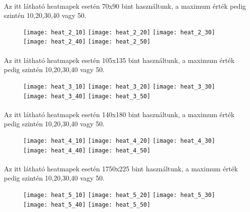 	\paragraph{}
	Az itt látható heatmapek esetén 70x90 bint használtunk, a maximum érték pedig szintén 10,20,30,40 vagy 50. 
	\begin{figure}[h]
		\begin{multicols}{2}
			\texttt{[image: heat\_2\_10]}
			\texttt{[image: heat\_2\_20]}
			\texttt{[image: heat\_2\_30]}
			\texttt{[image: heat\_2\_40]}
			\texttt{[image: heat\_2\_50]}		
		\end{multicols}
	\end{figure}	
	\clearpage	
	\paragraph{}
	Az itt látható heatmapek esetén 105x135 bint használtunk, a maximum érték pedig szintén 10,20,30,40 vagy 50. 
	\begin{figure}[h]
		\begin{multicols}{2}
			\texttt{[image: heat\_3\_10]}
			\texttt{[image: heat\_3\_20]}
			\texttt{[image: heat\_3\_30]}
			\texttt{[image: heat\_3\_40]}
			\texttt{[image: heat\_3\_50]}		
		\end{multicols}
	\end{figure}	
	\clearpage	
	\paragraph{}
	Az itt látható heatmapek esetén 140x180 bint használtunk, a maximum érték pedig szintén 10,20,30,40 vagy 50. 
	\begin{figure}[h]
		\begin{multicols}{2}
			\texttt{[image: heat\_4\_10]}
			\texttt{[image: heat\_4\_20]}
			\texttt{[image: heat\_4\_30]}
			\texttt{[image: heat\_4\_40]}
			\texttt{[image: heat\_4\_50]}		
		\end{multicols}
	\end{figure}	
	\clearpage	
	\paragraph{}
	Az itt látható heatmapek esetén 1750x225 bint használtunk, a maximum érték pedig szintén 10,20,30,40 vagy 50. 
	\begin{figure}[h]
		\begin{multicols}{2}
			\texttt{[image: heat\_5\_10]}
			\texttt{[image: heat\_5\_20]}
			\texttt{[image: heat\_5\_30]}
			\texttt{[image: heat\_5\_40]}
			\texttt{[image: heat\_5\_50]}		
		\end{multicols}
	\end{figure}